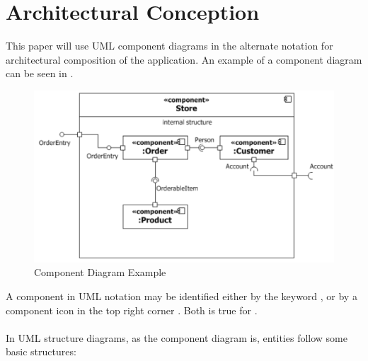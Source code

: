 \section{Architectural Conception}
This paper will use UML component diagrams in the alternate notation \parencite[cf.][212]{ObjectManagementGroup.01.03.2015} for architectural composition of the application. An example of a component diagram can be seen in .

\begin{figure}
    \centering
    \includegraphics[width=\textwidth]{img/componentExample.pdf}
    \caption[Component Diagram Example]{Component Diagram Example \parencites[2132]{ObjectManagementGroup.01.03.2015}}
    \label{fig:comEx}
\end{figure}

A component in UML notation may be identified either by the keyword , or by a component icon in the top right corner \parencites[cf.][208]{ObjectManagementGroup.01.03.2015}. Both is true for . 

\paragraph{} In UML structure diagrams, as the component diagram is, entities follow some basic structures:

